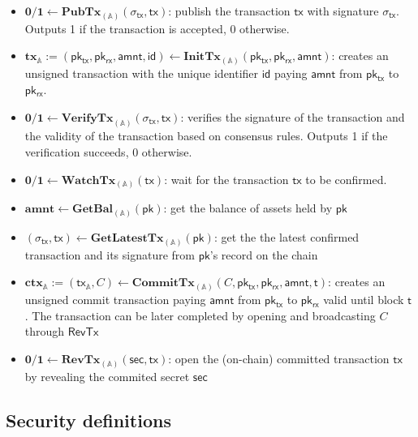 \documentclass{article}      	%
\begin{document}
\begin{itemize}[topsep=0pt, itemsep=0pt, leftmargin=2em]
    \item $\mathbf{0/1} \gets \mathbf{PubTx}_{(\mathbb{A})}(\sigma_{\mathsf{tx}}, \mathsf{tx})$: publish the transaction $\mathsf{tx}$ with signature $\sigma_{\mathsf{tx}}$. Outputs 1 if the transaction is accepted, 0 otherwise.
    \item $\mathbf{tx}_{\mathbb{A}} := (\mathsf{pk_{tx}}, \mathsf{pk_{rx}}, \mathsf{amnt}, \mathsf{id})  \gets \mathbf{InitTx}_{(\mathbb{A})}(\mathsf{pk_{tx}}, \mathsf{pk_{rx}}, \mathsf{amnt})$: creates an unsigned transaction with the unique identifier $\mathsf{id}$ paying $\mathsf{amnt}$ from $\mathsf{pk_{tx}}$ to $\mathsf{pk_{rx}}$.
    \item $\mathbf{0/1} \gets \mathbf{VerifyTx}_{(\mathbb{A})}(\sigma_{\mathsf{tx}}, \mathsf{tx})$: verifies the signature of the transaction and the validity of the transaction based on consensus rules. Outputs 1 if the verification succeeds, 0 otherwise.
    \item $\mathbf{0/1} \gets \mathbf{WatchTx}_{(\mathbb{A})}(\mathsf{tx})$: wait for the transaction $\mathsf{tx}$ to be confirmed.
    \item $\mathbf{amnt} \gets \mathbf{GetBal}_{(\mathbb{A})}(\mathsf{pk})$: get the balance of assets held by $\mathsf{pk}$
    \item $(\sigma_{\mathsf{tx}}, \mathsf{tx}) \gets \mathbf{GetLatestTx}_{(\mathbb{A})}(\mathsf{pk})$: get the the latest confirmed transaction and its signature from $\mathsf{pk}$'s record on the chain
    \item $\mathbf{ctx}_{\mathbb{A}} := (\mathsf{tx_{\mathbb{A}}}, C) \gets \mathbf{CommitTx}_{(\mathbb{A})}(C, \mathsf{pk_{tx}}, \mathsf{pk_{rx}}, \mathsf{amnt}, \mathsf{t})$: creates an unsigned commit transaction paying $\mathsf{amnt}$ from $\mathsf{pk_{tx}}$ to $\mathsf{pk_{rx}}$ valid until block $\mathsf{t}$. The transaction can be later completed by opening and broadcasting $C$ through $\mathsf{RevTx}$
    \item $ \mathbf{0/1} \gets \mathbf{RevTx}_{(\mathbb{A})}(\mathsf{sec}, \mathsf{tx})$: open the (on-chain) committed transaction $\mathsf{tx}$ by revealing the commited secret $\mathsf{sec}$
\end{itemize}

\subsection{Security definitions}
\end{document}
